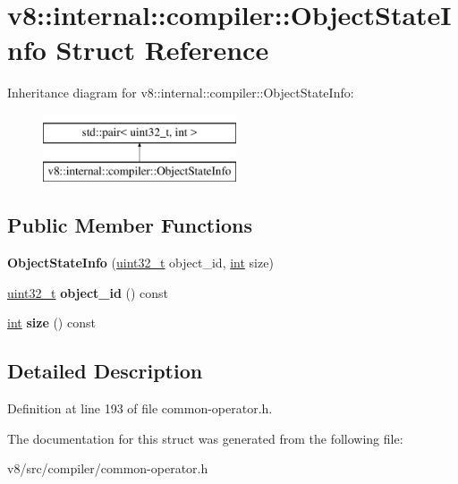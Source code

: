 \hypertarget{structv8_1_1internal_1_1compiler_1_1ObjectStateInfo}{}\section{v8\+:\+:internal\+:\+:compiler\+:\+:Object\+State\+Info Struct Reference}
\label{structv8_1_1internal_1_1compiler_1_1ObjectStateInfo}
Inheritance diagram for v8\+:\+:internal\+:\+:compiler\+:\+:Object\+State\+Info\+:\begin{figure}[H]
\begin{center}
\leavevmode
\includegraphics[height=2.000000cm]{structv8_1_1internal_1_1compiler_1_1ObjectStateInfo}
\end{center}
\end{figure}
\subsection*{Public Member Functions}
\begin{DoxyCompactItemize}
\item 
\mbox{\label{structv8_1_1internal_1_1compiler_1_1ObjectStateInfo_af400e5ce8f9187c2354c61cf12172dbb}} 
{\bfseries Object\+State\+Info} (\mbox{\hyperlink{classuint32__t}{uint32\+\_\+t}} object\+\_\+id, \mbox{\hyperlink{classint}{int}} size)
\item 
\mbox{\label{structv8_1_1internal_1_1compiler_1_1ObjectStateInfo_a3e5e9f602b4f3e41fdc4d2a0f8beca9d}} 
\mbox{\hyperlink{classuint32__t}{uint32\+\_\+t}} {\bfseries object\+\_\+id} () const
\item 
\mbox{\label{structv8_1_1internal_1_1compiler_1_1ObjectStateInfo_aad5e94cfd930f06c8f9966818f516f22}} 
\mbox{\hyperlink{classint}{int}} {\bfseries size} () const
\end{DoxyCompactItemize}


\subsection{Detailed Description}


Definition at line 193 of file common-\/operator.\+h.



The documentation for this struct was generated from the following file\+:\begin{DoxyCompactItemize}
\item 
v8/src/compiler/common-\/operator.\+h\end{DoxyCompactItemize}
